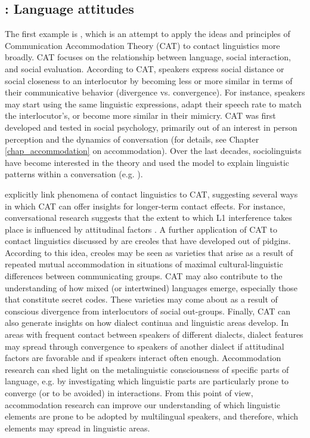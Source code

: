 \documentclass[output=paper]{langscibook}
\begin{document}
\subsection{\citet{niedzielskietal1996linguistic}: Language attitudes}
 
The first example is \textcite{niedzielskietal1996linguistic}, which is an attempt to apply the ideas and principles of Communication Accommodation Theory (CAT) to contact linguistics more broadly. CAT focuses on the relationship between language, social interaction, and social evaluation. According to CAT, speakers express social distance or social closeness to an interlocutor by becoming less or more similar in terms of their communicative behavior (divergence vs. convergence). For instance, speakers may start using the same linguistic expressions, adapt their speech rate to match the interlocutor's, or become more similar in their mimicry.
CAT was first developed and tested in social psychology, primarily out of an interest in person perception and the dynamics of conversation (for details, see Chapter \ref{chap_accommodation} on accommodation). 
Over the last decades, sociolinguists have become interested in the theory and used the model to explain linguistic patterns within a conversation (e.g. \citealt{coupland_accommodation_1984}).
 
\textcite{niedzielskietal1996linguistic} explicitly link phenomena of contact linguistics to CAT, suggesting several ways in which CAT can offer insights for longer-term contact effects. For instance, conversational research suggests that the extent to which L1 interference takes place is influenced by attitudinal factors \parencite{giles1979ethnicity}. A further application of CAT to contact linguistics discussed by \textcite{niedzielskietal1996linguistic} are creoles that have developed out of pidgins. According to this idea, creoles may be seen as varieties that arise as a result of repeated mutual accommodation in situations of maximal cultural-linguistic differences between communicating groups. CAT may also contribute to the understanding of how mixed (or intertwined) languages emerge, especially those that constitute secret codes. These varieties may come about as a result of conscious divergence from interlocutors of social out-groups. Finally, CAT can also generate insights on how dialect continua and linguistic areas develop. In areas with frequent contact between speakers of different dialects, dialect features may spread through convergence to speakers of another dialect if attitudinal factors are favorable and if speakers interact often enough. Accommodation research can shed light on the metalinguistic consciousness of specific parts of language, e.g. by investigating which linguistic parts are particularly prone to converge (or to be avoided) in interactions. From this point of view, accommodation research can improve our understanding of which linguistic elements are prone to be adopted by multilingual speakers, and therefore, which elements may spread in linguistic areas.\\
\end{document}
